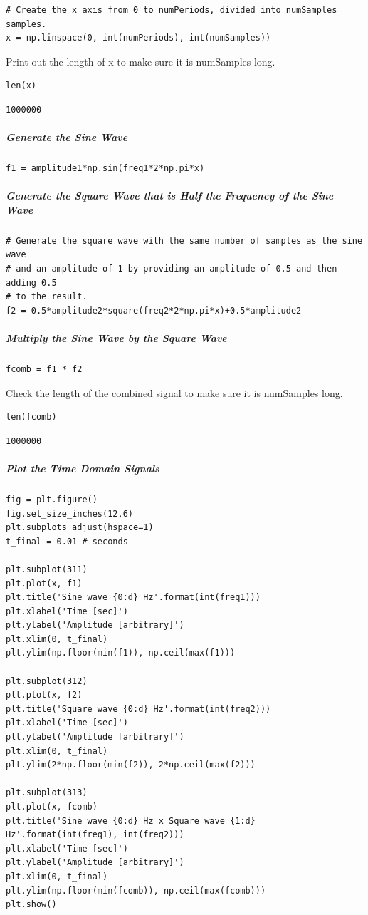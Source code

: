 \begin{verbatim}
# Create the x axis from 0 to numPeriods, divided into numSamples samples.
x = np.linspace(0, int(numPeriods), int(numSamples))
\end{verbatim}

Print out the length of x to make sure it is numSamples long.

\begin{verbatim}
len(x)
\end{verbatim}

\begin{verbatim}
1000000
\end{verbatim}

\subparagraph{Generate the Sine Wave}

\begin{verbatim}
f1 = amplitude1*np.sin(freq1*2*np.pi*x)
\end{verbatim}

\subparagraph{Generate the Square Wave that is Half the Frequency of the Sine Wave}

\begin{verbatim}
# Generate the square wave with the same number of samples as the sine wave
# and an amplitude of 1 by providing an amplitude of 0.5 and then adding 0.5 
# to the result.
f2 = 0.5*amplitude2*square(freq2*2*np.pi*x)+0.5*amplitude2
\end{verbatim}

\subparagraph{Multiply the Sine Wave by the Square Wave}

\begin{verbatim}
fcomb = f1 * f2
\end{verbatim}

Check the length of the combined signal to make sure it is numSamples long.

\begin{verbatim}
len(fcomb)
\end{verbatim}

\begin{verbatim}
1000000
\end{verbatim}

\subparagraph{Plot the Time Domain Signals}

\begin{verbatim}
fig = plt.figure()
fig.set_size_inches(12,6)
plt.subplots_adjust(hspace=1)
t_final = 0.01 # seconds

plt.subplot(311)
plt.plot(x, f1)
plt.title('Sine wave {0:d} Hz'.format(int(freq1)))
plt.xlabel('Time [sec]')
plt.ylabel('Amplitude [arbitrary]')
plt.xlim(0, t_final)
plt.ylim(np.floor(min(f1)), np.ceil(max(f1)))

plt.subplot(312)
plt.plot(x, f2)
plt.title('Square wave {0:d} Hz'.format(int(freq2)))
plt.xlabel('Time [sec]')
plt.ylabel('Amplitude [arbitrary]')
plt.xlim(0, t_final)
plt.ylim(2*np.floor(min(f2)), 2*np.ceil(max(f2)))

plt.subplot(313)
plt.plot(x, fcomb)
plt.title('Sine wave {0:d} Hz x Square wave {1:d} Hz'.format(int(freq1), int(freq2)))
plt.xlabel('Time [sec]')
plt.ylabel('Amplitude [arbitrary]')
plt.xlim(0, t_final)
plt.ylim(np.floor(min(fcomb)), np.ceil(max(fcomb)))
plt.show()
\end{verbatim}

